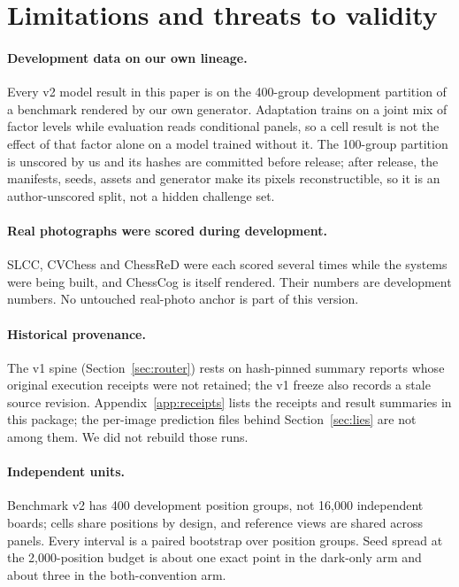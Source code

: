 \section{Limitations and threats to validity}
\label{sec:limitations}

\paragraph{Development data on our own lineage.} Every v2 model result in this paper is on the
400-group development partition of a benchmark rendered by our own generator. Adaptation trains on
a joint mix of factor levels while evaluation reads conditional panels, so a cell result is not the
effect of that factor alone on a model trained without it. The 100-group partition is unscored by
us and its hashes are committed before release; after release, the manifests, seeds,
assets and generator make its pixels reconstructible, so it is an author-unscored split, not a
hidden challenge set.

\paragraph{Real photographs were scored during development.} SLCC, CVChess and ChessReD were each
scored several times while the systems were being built, and ChessCog is itself rendered. Their
numbers are development numbers. No untouched real-photo anchor is part of this version.

\paragraph{Historical provenance.} The v1 spine (Section~\ref{sec:router}) rests on hash-pinned
summary reports whose original execution receipts were not retained; the v1 freeze also records a
stale source revision. Appendix~\ref{app:receipts} lists the receipts and result summaries in this package; the per-image
prediction files behind Section~\ref{sec:lies} are not among them. We did not rebuild those runs.

\paragraph{Independent units.} Benchmark v2 has 400 development position groups, not 16{,}000
independent boards; cells share positions by design, and reference views are shared across panels.
Every interval is a paired bootstrap over position groups. Seed spread at the 2{,}000-position
budget is about one exact point in the dark-only arm and about three in the both-convention arm.

